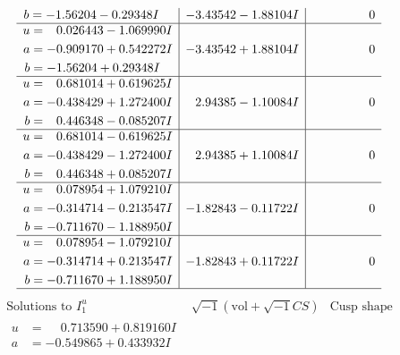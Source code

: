 \documentclass[1p]{elsarticle_modified}
\theoremstyle{definition}
\newcommand{\I}{\sqrt{-1}}
\begin{document}
$$\begin{array}{c|c|c}
\begin{aligned}
b &= -1.56204 - 0.29348 I\end{aligned}
 & -3.43542 - 1.88104 I & \phantom{-0.000000 } 0 \\ \hline\begin{aligned}
u &= \phantom{-}0.026443 - 1.069990 I \\
a &= -0.909170 + 0.542272 I \\
b &= -1.56204 + 0.29348 I\end{aligned}
 & -3.43542 + 1.88104 I & \phantom{-0.000000 } 0 \\ \hline\begin{aligned}
u &= \phantom{-}0.681014 + 0.619625 I \\
a &= -0.438429 + 1.272400 I \\
b &= \phantom{-}0.446348 - 0.085207 I\end{aligned}
 & \phantom{-}2.94385 - 1.10084 I & \phantom{-0.000000 } 0 \\ \hline\begin{aligned}
u &= \phantom{-}0.681014 - 0.619625 I \\
a &= -0.438429 - 1.272400 I \\
b &= \phantom{-}0.446348 + 0.085207 I\end{aligned}
 & \phantom{-}2.94385 + 1.10084 I & \phantom{-0.000000 } 0 \\ \hline\begin{aligned}
u &= \phantom{-}0.078954 + 1.079210 I \\
a &= -0.314714 - 0.213547 I \\
b &= -0.711670 - 1.188950 I\end{aligned}
 & -1.82843 - 0.11722 I & \phantom{-0.000000 } 0 \\ \hline\begin{aligned}
u &= \phantom{-}0.078954 - 1.079210 I \\
a &= -0.314714 + 0.213547 I \\
b &= -0.711670 + 1.188950 I\end{aligned}
 & -1.82843 + 0.11722 I & \phantom{-0.000000 } 0\\
 \hline 
 \end{array}$$\newpage$$\begin{array}{c|c|c}  
\text{Solutions to }I^u_{1}& \I (\text{vol} + \sqrt{-1}CS) & \text{Cusp shape}\\
 \hline 
\begin{aligned}
u &= \phantom{-}0.713590 + 0.819160 I \\
a &= -0.549865 + 0.433932 I \\

\end{aligned}
\end{array}$$
\end{document}
